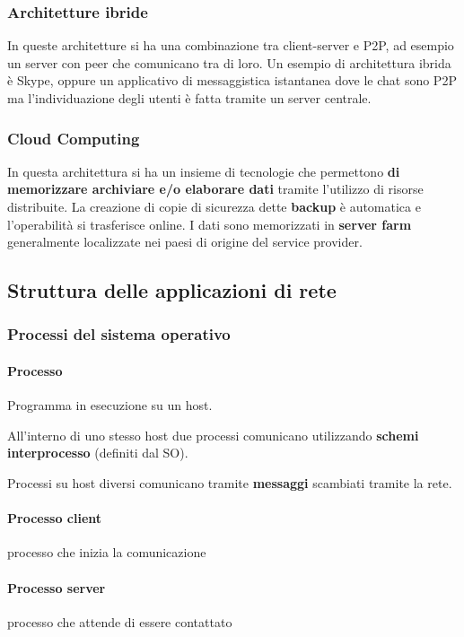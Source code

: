        \subsubsection{Architetture ibride}
            In queste architetture si ha una combinazione tra client-server e \Acrshort*{P2P}, ad esempio un server con peer che comunicano tra di loro. Un esempio di architettura ibrida è Skype, oppure un applicativo di messaggistica istantanea dove le chat sono \Acrshort*{P2P} ma l'individuazione degli utenti è fatta tramite un server centrale.
        \subsubsection{Cloud Computing}
            In questa architettura si ha un insieme di tecnologie che permettono \textbf{di memorizzare archiviare e/o elaborare dati} tramite l'utilizzo di risorse distribuite. La creazione di copie di sicurezza dette \textbf{backup} è automatica e l'operabilità si trasferisce online. I dati sono memorizzati in \textbf{server farm} generalmente localizzate nei paesi di origine del service provider.
    \subsection{Struttura delle applicazioni di rete}
        \subsubsection{Processi del sistema operativo}
            \paragraph{Processo} Programma in esecuzione su un host.
            
            All'interno di uno stesso host due processi comunicano utilizzando \textbf{schemi interprocesso} (definiti dal \Acrshort*{SO}).

            Processi su host diversi comunicano tramite \textbf{messaggi} scambiati tramite la rete.
            \paragraph{Processo client} processo che inizia la comunicazione
            \paragraph{Processo server} processo che attende di essere contattato
